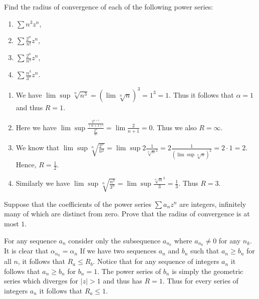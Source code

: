 \begin{problem}
  Find the radius of convergence of each of the following power series:
  \begin{enumerate}[label=(\alph*)]
    \item $\sum n^3 z^n$,
    \item $\sum \frac{2^n}{n!} z^n$,
    \item $\sum \frac{2^n}{n^2} z^n$,
    \item $\sum \frac{n^3}{3^n} z^n$.
  \end{enumerate}
\end{problem}

\begin{solution}
  \begin{enumerate}[label=(\alph*)]
    \item We have $\lim \sup \sqrt[n]{n^3} = (\lim \sqrt[n]{n})^3 = 1^3 = 1$.
      Thus it follows that $\alpha = 1$ and thus $R = 1$.
    \item Here we have $\lim \sup \frac{\frac{2^{n + 1}}{(n + 1)!}}{\frac{2^n}{n!}} = \lim \frac{2}{n + 1} = 0$.
      Thus we also $R = \infty$.
    \item We know that $\lim \sup \sqrt[n]{\frac{2^n}{n^2}} = \lim \sup 2 \frac{1}{\sqrt[n]{n}^2} = 2 \frac{1}{(\lim \sup \sqrt[n]{n})^2} = 2 \cdot 1 = 2$.
      Hence, $R = \frac{1}{2}$.
    \item Similarly we have $\lim \sup \sqrt[n]{\frac{n^3}{3^n}} = \lim \sup \frac{\sqrt[n]{n}^3}{3} = \frac{1}{3}$.
      Thus $R = 3$.
  \end{enumerate}
\end{solution}

\begin{problem}
  Suppose that the coefficients of the power series $\sum a_n z^n$ are integers, infinitely many of which are distinct from zero.
  Prove that the radius of convergence is at most $1$.
\end{problem}

\begin{solution}
  For any sequence $a_n$ consider only the subsequence $a_{n_k}$ where $a_{n_k} \neq 0$ for any $n_k$.
  It is clear that $\alpha_{n_k} = \alpha_{n}$
  If we have two sequences $a_n$ and $b_n$ such that $a_n \ge b_n$ for all $n$, it follows that $R_a \le R_b$.
  Notice that for any sequence of integers $a_n$ it follows that $a_n \ge b_n$ for $b_n = 1$.
  The power series of $b_n$ is simply the geometric series which diverges for $|z| > 1$ and thus has $R = 1$.
  Thus for every series of integers $a_n$ it follows that $R_a \le 1$.
\end{solution}

